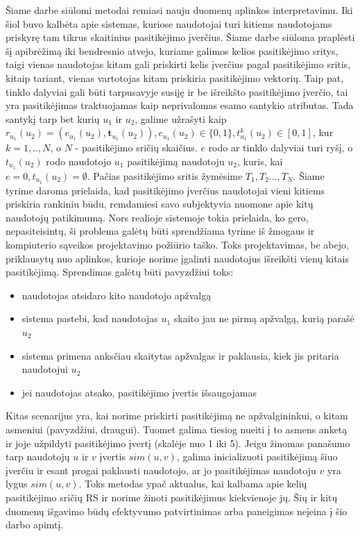 \documentclass{VUMIFInfMagistrinis}
\begin{document}
Šiame darbe siūlomi metodai remiasi nauju duomenų aplinkos interpretavimu. Iki šiol buvo kalbėta apie sistemas, kuriose naudotojai turi kitiems naudotojams priskyrę tam tikrus skaitinius pasitikėjimo įverčius. Šiame darbe siūloma praplėsti šį apibrėžimą iki bendresnio atvejo, kuriame galimos kelios pasitikėjimo sritys, taigi vienas naudotojas kitam gali priskirti kelis įverčius pagal pasitikėjimo sritis, kitaip tariant, vienas vartotojas kitam priskiria pasitikėjimo vektorių. Taip pat, tinklo dalyviai gali būti tarpusavyje susiję ir be išreikšto pasitikėjimo įverčio, tai yra pasitikėjimas traktuojamas kaip neprivalomas esamo santykio atributas. Tada santykį tarp bet kurių $u_1$ ir $u_2$, galime užrašyti kaip $r_{u_1}({u_2})=(e_{u_1}({u_2}), \boldsymbol{t}_{u_1}({u_2})), e_{u_1}({u_2}) \in \{0,1\}, t_{u_1}^k({u_2})\in[0,1]$, kur $k=1,..,N$, o $N$ - pasitikėjimo sričių skaičius. $e$ rodo ar tinklo dalyviai turi ryšį, o $t_{u_1}({u_2})$ rodo naudotojo $u_1$ pasitikėjimą naudotoju $u_2$, kuris, kai $e=0, t_{u_1}({u_2}) = \emptyset$. Pačias pasitikėjimo sritis žymėsime $T_1, T_2..., T_N$.
\newline
\indent
Šiame tyrime daroma prielaida, kad pasitikėjimo įverčius naudotojai vieni kitiems priskiria rankiniu būdu, remdamiesi savo subjektyvia nuomone apie kitų naudotojų patikimumą. Nors realioje sistemoje tokia prielaida, ko gero, nepasiteisintų, ši problema galėtų būti sprendžiama tyrime iš žmogaus ir kompiuterio sąveikos projektavimo požiūrio taško. Toks projektavimas, be abejo, priklausytų nuo aplinkos, kurioje norime įgalinti naudotojus išreikšti vienų kitais pasitikėjimą. Sprendimas galėtų būti pavyzdžiui toks: 
\begin{itemize}
	\item naudotojas atsidaro kito naudotojo apžvalgą
	\item sistema pastebi, kad naudotojas $u_1$ skaito jau ne pirmą apžvalgą, kurią parašė $u_2$
	\item sistema primena anksčiau skaitytas apžvalgas ir paklausia, kiek jis pritaria naudotojui $u_2$
	\item jei naudotojas atsako, pasitikėjimo įvertis išsaugojamas
\end{itemize}
\indent
Kitas scenarijus yra, kai norime priskirti pasitikėjimą ne apžvalgininkui, o kitam asmeniui (pavyzdžiui, draugui). Tuomet galima tiesiog nueiti į to asmens anketą ir joje užpildyti pasitikėjimo įvertį (skalėje nuo 1 iki 5).
\indent
Jeigu žinomas panašumo tarp naudotojų $u$ ir $v$ įvertis $sim(u,v)$, galima inicializuoti pasitikėjimą šiuo įverčiu ir esant progai paklausti naudotojo, ar jo pasitikėjimas naudotoju $v$ yra lygus $sim(u,v)$. Toks metodas ypač aktualus, kai kalbama apie kelių pasitikėjimo sričių RS ir norime žinoti pasitikėjimus kiekvienoje jų. Šių ir kitų duomenų išgavimo būdų efektyvumo patvirtinimas arba paneigimas neįeina į šio darbo apimtį.
\end{document}
